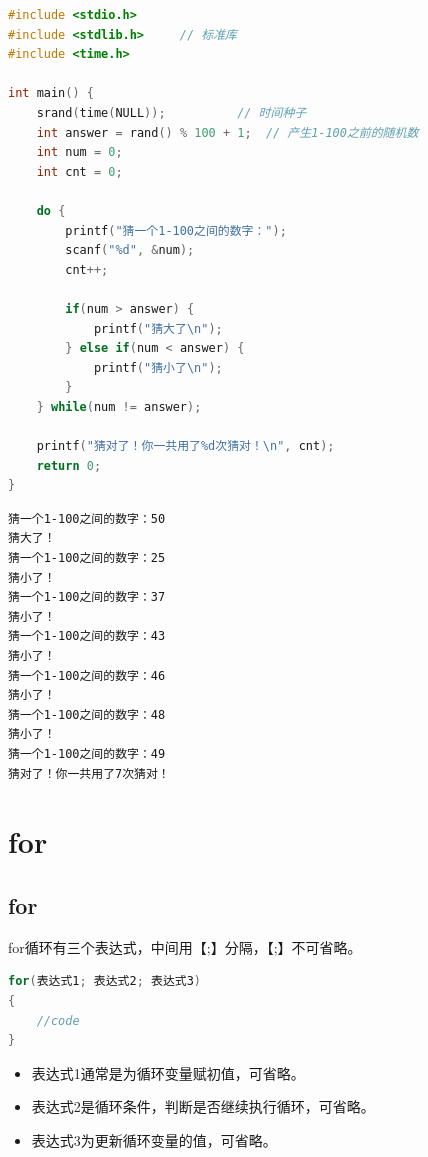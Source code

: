 \vspace{0.5cm}


\begin{lstlisting}[language=C]
#include <stdio.h>
#include <stdlib.h>     // 标准库
#include <time.h>

int main() {
    srand(time(NULL));          // 时间种子
    int answer = rand() % 100 + 1;  // 产生1-100之前的随机数
    int num = 0;
    int cnt = 0;

    do {
        printf("猜一个1-100之间的数字：");
        scanf("%d", &num);
        cnt++;
        
        if(num > answer) {
            printf("猜大了\n");
        } else if(num < answer) {
            printf("猜小了\n");
        }
    } while(num != answer);
    
    printf("猜对了！你一共用了%d次猜对！\n", cnt);
    return 0;
}
\end{lstlisting}

\begin{tcolorbox}
	\begin{verbatim}
猜一个1-100之间的数字：50
猜大了！
猜一个1-100之间的数字：25
猜小了！
猜一个1-100之间的数字：37
猜小了！
猜一个1-100之间的数字：43
猜小了！
猜一个1-100之间的数字：46
猜小了！
猜一个1-100之间的数字：48
猜小了！
猜一个1-100之间的数字：49
猜对了！你一共用了7次猜对！
\end{verbatim}
\end{tcolorbox}

\newpage

\section{for}

\subsection{for}

for循环有三个表达式，中间用【;】分隔，【;】不可省略。

\vspace{-0.5cm}

\begin{lstlisting}[language=C]
for(表达式1; 表达式2; 表达式3)
{
    //code
}
\end{lstlisting}

\begin{itemize}
	\item 表达式1通常是为循环变量赋初值，可省略。
	\item 表达式2是循环条件，判断是否继续执行循环，可省略。
	\item 表达式3为更新循环变量的值，可省略。
\end{itemize}

